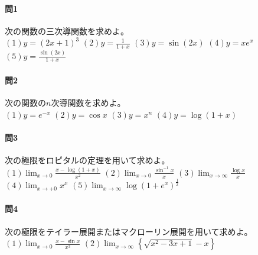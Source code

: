 \documentclass[a4j,dvipdfmx]{jsarticle}
\begin{document}
                \paragraph{問1}次の関数の三次導関数を求めよ。\\
                $(1)y=(2x+1)^3$\hspace{3mm}
                $(2)\displaystyle y=\frac{1}{1+x}$\hspace{3mm}
                $(3)y=\sin(2x)$\hspace{3mm}
                $(4)y=xe^x$\hspace{3mm}
                $\displaystyle(5)y=\frac{\sin(2x)}{1+x}$

                \paragraph{問2}次の関数の$n$次導関数を求めよ。\\
                $(1)y=e^{-x}$\hspace{3mm}
                $(2)y=\cos x$\hspace{3mm}
                $(3)y=x^n$\hspace{3mm}
                $(4)y=\log(1+x)$

                \paragraph{問3}次の極限をロピタルの定理を用いて求めよ。\\
                $\displaystyle(1)\lim_{x\to 0}\frac{x-\log(1+x)}{x^2}$\hspace{3mm}
                $\displaystyle(2)\lim_{x\to 0}\frac{\sin^{-1}x}{x} $\hspace{3mm}
                $\displaystyle(3)\lim_{x\to \infty}\frac{\log x}{x}$\hspace{3mm}
                $\displaystyle(4)\lim_{x\to+0}x^x$\hspace{3mm}
                $\displaystyle(5)\lim_{x\to\infty}\log(1+e^x)^{\frac{1}{x}}$

                \paragraph{問4}次の極限をテイラー展開またはマクローリン展開を用いて求めよ。\\
                $\displaystyle(1)\lim_{x\to 0}\frac{x-\sin x}{x^3}$\hspace{50mm}
                $\displaystyle(2)\lim_{x\to \infty}\left\{\sqrt{x^2-3x+1}-x\right\}$
\end{document}
